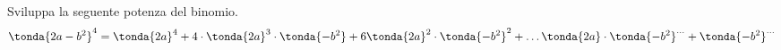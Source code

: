 \subsubsection*{}

\begin{esercizio}
\label{ese:11.28}
Sviluppa la seguente potenza del binomio.
\[\tonda{2a-b^{2}}^{4}=\tonda{2a}^{4}+4\cdot
\tonda{2a}^{3}\cdot \tonda{-b^{2}}+6\tonda{2a}^{2}\cdot
\tonda{-b^{2}}^{2}+\ldots \tonda{2a}\cdot
\tonda{-b^{2}}^{\ldots }+\tonda{-b^{2}}^{\ldots }\]
\end{esercizio}

